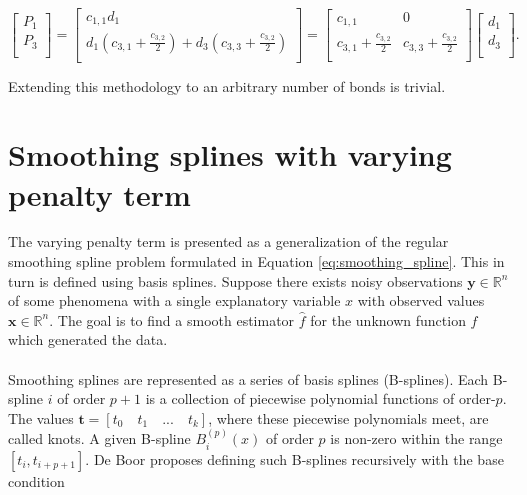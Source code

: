 \documentclass[a4paper]{artikel3}
\newcommand{\R}{\mathbb{R}}    %
\numberwithin{equation}{section}
\numberwithin{theorem}{section}
\numberwithin{proposition}{section}
\numberwithin{lemma}{section}
\begin{document}
\begin{equation*}
    \begin{bmatrix}
        P_1 \\
        P_3 \\
    \end{bmatrix} = 
    \begin{bmatrix}
        c_{1, 1}d_1 \\
        d_1\left( c_{3, 1} + \frac{c_{3, 2}}{2} \right) + d_3\left( c_{3, 3} + \frac{c_{3, 2}}{2} \right) \\
    \end{bmatrix} =
    \begin{bmatrix}
        c_{1, 1}                      & 0                             \\
        c_{3, 1} + \frac{c_{3, 2}}{2} & c_{3, 3} + \frac{c_{3, 2}}{2} \\
    \end{bmatrix} 
    \begin{bmatrix}
        d_1 \\
        d_3 \\
    \end{bmatrix}
     .
\end{equation*}

Extending this methodology to an arbitrary number of bonds is trivial.


\clearpage


\section{Smoothing splines with varying penalty term}
\label{app:varying_penalty_term}


The varying penalty term is presented as a generalization of the regular smoothing spline problem formulated in Equation \eqref{eq:smoothing_spline}. This in turn is defined using basis splines. Suppose there exists noisy observations $\mathbf{y} \in \R^n$ of some phenomena with a single explanatory variable $x$ with observed values $\mathbf{x} \in \R^n$. The goal is to find a smooth estimator $\hat{f}$ for the unknown function $f$ which generated the data. \\
\\
Smoothing splines are represented as a series of basis splines (B-splines). Each B-spline $i$ of order $p +1$ is a collection of piecewise polynomial functions of order-$p$. The values $\mathbf{t} = [t_0 \quad t_1 \quad ... \quad t_k]$, where these piecewise polynomials meet, are called knots. A given B-spline $B_i^{(p)}(x)$ of order $p$ is non-zero within the range $[t_i, t_{i+p+1}]$. De Boor \cite{de_boor_2003} proposes defining such B-splines recursively with the base condition 
\end{document}
